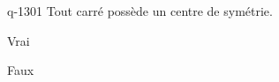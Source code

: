 \begin{truefalse}{q-1301}
Tout carré possède un centre de symétrie.
\item* Vrai
\item Faux
\end{truefalse}

